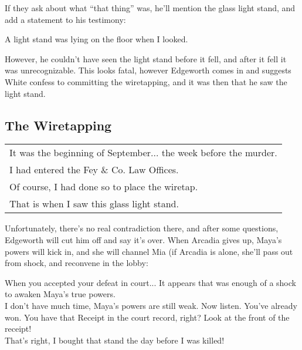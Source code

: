 If they ask about what ``that thing'' was, he'll mention the glass light stand, and add a statement to his testimony:
\begin{center}
A light stand was lying on the floor when I looked.
\end{center}

However, he couldn't have seen the light stand before it fell, and after it fell it was unrecognizable. This looks fatal, however Edgeworth comes in and suggests White confess to committing the wiretapping, and it was then that he saw the light stand.

\subsection{The Wiretapping}
\begin{tabular}{p{11cm}}
It was the beginning of September... the week before the murder.\\
I had entered the Fey \& Co. Law Offices.\\
Of course, I had done so to place the wiretap.\\
That is when I saw this glass light stand. \\
\end{tabular}

Unfortunately, there's no real contradiction there, and after some questions, Edgeworth will cut him off and say it's over. When Arcadia gives up, Maya's powers will kick in, and she will channel Mia (if Arcadia is alone, she'll pass out from shock, and reconvene in the lobby:
\begin{center}
When you accepted your defeat in court... It appears that was enough of a shock to awaken Maya's true powers. \\
I don't have much time, Maya's powers are still weak. Now listen. You've already won. You have that Receipt in the court record, right? Look at the front of the receipt!\\
That's right, I bought that stand the day before I was killed!\\
\end{center}

